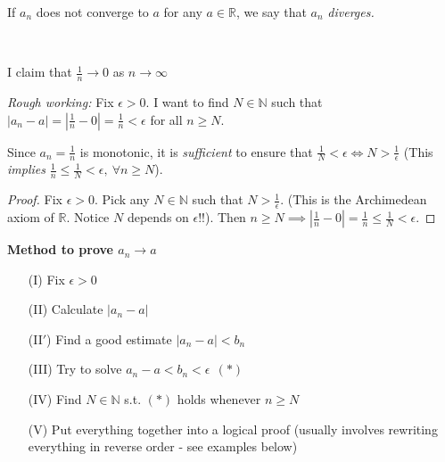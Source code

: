 \begin{definition}
If $a_n$ does not converge to $a$ for any $a\in \mathbb{R}$, we say that $a_n$ \emph{diverges.}
\end{definition}~

\begin{example}
I claim that $\frac{1}{n} \to 0$ as $n \to \infty$

\textit{Rough working:} Fix $\epsilon >0$. I want to find $N \in \mathbb{N}$ such that $|a_n - a| = |\frac{1}{n} - 0| = \frac{1}{n} < \epsilon$ for all $n \geq N$. 
\begin{center}
\end{center}


Since $a_n = \frac{1}{n}$ is monotonic, it is \emph{sufficient} to ensure that $\frac{1}{N} < \epsilon \iff N > \frac{1}{\epsilon}$ (This \emph{implies} $\frac{1}{n} \leq \frac{1}{N} < \epsilon,~\forall n \geq N$).

\begin{proof}
Fix $\epsilon >0$. %
 Pick any $N \in \mathbb{N}$ such that $N > \frac{1}{\epsilon}$. (This is the Archimedean axiom of $\mathbb{R}$. Notice $N$ depends on $\epsilon$!!). Then $n \geq N \implies |\frac{1}{n}-0| = \frac{1}{n} \leq \frac{1}{N} < \epsilon$.
\end{proof}


\end{example}


\textbf{Method to prove $a_n \to a$}
\begin{enumerate}
\item[(I)] Fix $\epsilon > 0$
\item[(II)] Calculate $|a_n - a|$
\item[(II$'$)] Find a good estimate $|a_n - a| < b_n$
\item[(III)] Try to solve $a_n - a < b_n < \epsilon ~~(*)$
\item[(IV)] Find $N \in \mathbb{N}$ s.t. $(*)$ holds whenever $n \geq N$
\item[(V)] Put everything together into a logical proof (usually involves rewriting everything in reverse order - see examples below)
\end{enumerate}~

